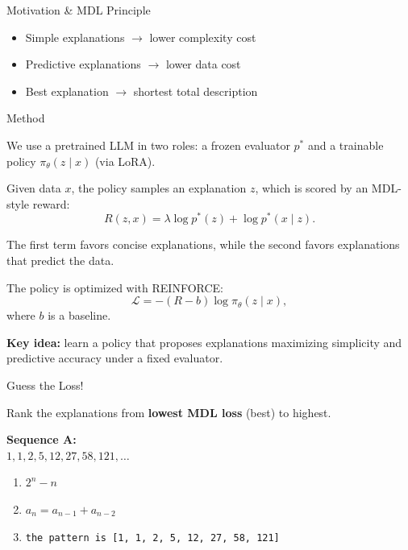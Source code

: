 \documentclass[final]{beamer}
\newlength{\colwidth}
\begin{document}
\begin{frame}[t]
\begin{columns}[t]
\begin{column}{\colwidth}
\begin{block}{Motivation \& MDL Principle}
\begin{itemize}
  \item Simple explanations $\rightarrow$ lower complexity cost
  \item Predictive explanations $\rightarrow$ lower data cost
  \item Best explanation $\rightarrow$ shortest total description
\end{itemize}

\end{block}

\begin{block}{Method}

  We use a pretrained LLM in two roles:
  a frozen evaluator $p^*$ and a trainable policy
  $\pi_\theta(z \mid x)$ (via LoRA).

  Given data $x$, the policy samples an explanation $z$,
  which is scored by an MDL-style reward:
  \begin{equation*}
    R(z, x) = \lambda \log p^*(z) + \log p^*(x \mid z).
  \end{equation*}

  The first term favors concise explanations,
  while the second favors explanations that predict the data.

  The policy is optimized with REINFORCE:
  \begin{equation*}
    \mathcal{L}
    = -(R - b)\log \pi_\theta(z \mid x),
  \end{equation*}
  where $b$ is a baseline.

  \smallskip

  \textbf{Key idea:}
  learn a policy that proposes explanations maximizing
  simplicity and predictive accuracy under a fixed evaluator.

\end{block}

\begin{block}{Guess the Loss!}

\small

Rank the explanations from \textbf{lowest MDL loss} (best) to highest.

\vspace{0.4em}

\textbf{Sequence A:} \\
$1, 1, 2, 5, 12, 27, 58, 121, \dots$

\begin{enumerate}
  \item $2^n - n$
  \item $a_n = a_{n-1} + a_{n-2}$
  \item \texttt{the pattern is [1, 1, 2, 5, 12, 27, 58, 121]}
\end{enumerate}


\end{block}
\end{column}
\end{columns}
\end{frame}
\end{document}
